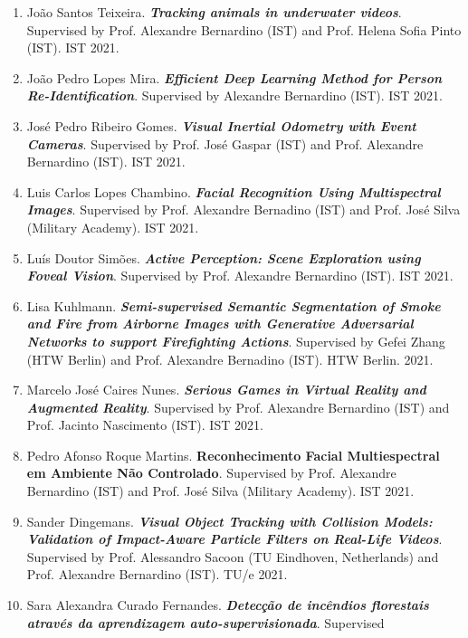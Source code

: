 \begin{enumerate}
{{  Models of Distributed Computer Vision Methods for Decision Making in
  Detection and Tracking Algorithms in UAVs}}. Supervised by Prof
  Alexandre Bernardino (IST) and Prof. Ricardo Ribeiro (IST). IST 2021.
\item
  João Santos Teixeira. \emph{\textbf{Tracking animals in underwater
  videos}}. Supervised by Prof. Alexandre Bernardino (IST) and Prof.
  Helena Sofia Pinto (IST). IST 2021.
\item
  João Pedro Lopes Mira. \emph{\textbf{Efficient Deep Learning Method
  for Person Re-Identification}}. Supervised by Alexandre Bernardino
  (IST). IST 2021.
\item
  José Pedro Ribeiro Gomes. \emph{\textbf{Visual Inertial Odometry with
  Event Cameras}}. Supervised by Prof. José Gaspar (IST) and Prof.
  Alexandre Bernardino (IST). IST 2021.
\item
  Luis Carlos Lopes Chambino. \emph{\textbf{Facial Recognition Using
  Multispectral Images}}. Supervised by Prof. Alexandre Bernadino (IST)
  and Prof. José Silva (Military Academy). IST 2021.
\item
  Luís Doutor Simões. \emph{\textbf{Active Perception: Scene Exploration
  using Foveal Vision}}. Supervised by Prof. Alexandre Bernardino (IST).
  IST 2021.
\item
  Lisa Kuhlmann. \emph{\textbf{Semi-supervised Semantic Segmentation of
  Smoke and Fire from Airborne Images with Generative Adversarial
  Networks to support Firefighting Actions}}. Supervised by Gefei Zhang
  (HTW Berlin) and Prof. Alexandre Bernadino (IST). HTW Berlin. 2021.
\item
  Marcelo José Caires Nunes. \emph{\textbf{Serious Games in Virtual
  Reality and Augmented Reality}}. Supervised by Prof. Alexandre
  Bernardino (IST) and Prof. Jacinto Nascimento (IST). IST 2021.
\item
  Pedro Afonso Roque Martins. \textbf{Reconhecimento Facial
  Multiespectral em Ambiente Não Controlado}. Supervised by Prof.
  Alexandre Bernardino (IST) and Prof. José Silva (Military Academy).
  IST 2021.
\item
  Sander Dingemans. \emph{\textbf{Visual Object Tracking with Collision
  Models: Validation of Impact-Aware Particle Filters on Real-Life
  Videos}}. Supervised by Prof. Alessandro Sacoon (TU Eindhoven,
  Netherlands) and Prof. Alexandre Bernardino (IST). TU/e 2021.
\item
  Sara Alexandra Curado Fernandes. \emph{\textbf{Detecção de incêndios
  florestais através da aprendizagem auto-supervisionada}}. Supervised

\end{enumerate}
